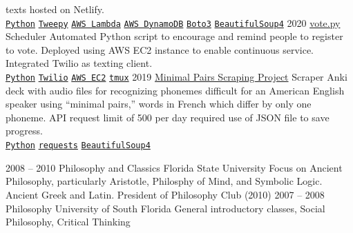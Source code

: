 \documentclass[9pt]{developercv} %
\begin{document}
\begin{entrylist}
{            texts hosted on Netlify.
        \\
        \texttt{{\href{https://www.python.org/}{Python}}}\slashsep
        \texttt{{\href{https://www.tweepy.org/}{Tweepy}}}\slashsep
        \texttt{{\href{https://aws.amazon.com/lambda/}{AWS Lambda}}}\slashsep
        \texttt{{\href{https://aws.amazon.com/dynamodb/}{AWS DynamoDB}}}\slashsep
        \texttt{{\href{https://boto3.amazonaws.com/v1/documentation/api/latest/index.html}{Boto3}}}\slashsep
        \texttt{{\href{https://www.crummy.com/software/BeautifulSoup/}{BeautifulSoup4}}}
        }
	\entry
		{2020}
        {\href{https://github.com/malan88/vote}{vote.py}}
		{Scheduler}
        {
            Automated Python script to encourage and remind people to register
            to vote. Deployed using AWS EC2 instance to enable continuous
            service. Integrated Twilio as texting client.
        \\
        \texttt{{\href{https://www.python.org/}{Python}}}\slashsep
        \texttt{{\href{https://www.twilio.com/}{Twilio}}}\slashsep
        \texttt{{\href{https://aws.amazon.com/ec2/}{AWS EC2}}}\slashsep
        \texttt{{\href{https://github.com/tmux/tmux}{tmux}}}
        }
	\entry
		{2019}
        {
            \href{https://github.com/malan88/minimalpairs}
            {Minimal Pairs Scraping Project}
        }
		{Scraper}
        {Anki deck with audio files for recognizing phonemes difficult for an
        American English speaker using “minimal pairs,” words in French which
        differ by only one phoneme. API request limit of 500 per day required
        use of JSON file to save progress.
        \\
        \texttt{{\href{https://www.python.org/}{Python}}}\slashsep
        \texttt{{\href{https://requests.readthedocs.io/en/master/}{requests}}}\slashsep
        \texttt{{\href{https://www.crummy.com/software/BeautifulSoup/}{BeautifulSoup4}}}
        }
\end{entrylist}



\begin{entrylist}
	\entry
		{2008 -- 2010}
		{Philosophy and Classics}
		{Florida State University}
        {Focus on Ancient Philosophy, particularly Aristotle, Philosphy of Mind,
        and Symbolic Logic. Ancient Greek and Latin. President of Philosophy
        Club (2010)}
	\entry
		{2007 -- 2008}
		{Philosophy}
		{University of South Florida}
        {General introductory classes, Social Philosophy, Critical Thinking}
\end{entrylist}
\end{document}
